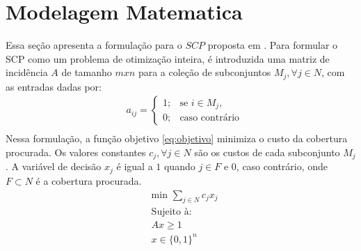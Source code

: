 \section{Modelagem Matematica}\label{sec:modelagem} 
Essa seção apresenta a formulação para o $SCP$ proposta em \cite{Bertsimas05}. Para formular o SCP como um problema
de otimização inteira, é introduzida uma matriz de incidência $A$ de tamanho $mxn$ para a coleção de subconjuntos 
$M_j, \forall j \in N$, com as entradas dadas por: \
\begin{align}
    & a_{ij} = \left \{\begin{array}{ll} 1; & \textrm{se } i \in M_j \textrm{,} \nonumber \\
    0; & \textrm{caso contrário} \nonumber \label{eq:fluxo}
    \end{array}\right. \\
\end{align}
Nessa formulação, a função objetivo \eqref{eq:objetivo} minimiza o custo da cobertura procurada. 
Os valores constantes $c_j, \forall j \in N$ são os custos de cada subconjunto $M_j$. 
A variável de decisão $x_j$ é igual a $1$ quando $j \in F$ e $0$, caso contrário, onde $F \subset N$ é a cobertura procurada. \\
\begin{align}
    & \text{min } \sum_{j \in N} c_jx_j \label{eq:objetivo} \\
    & \text{Sujeito à:} \nonumber \\
    & Ax \ge 1 \\
    & x \in \{0,1\}^n \label{eq:binarias}
\end{align}